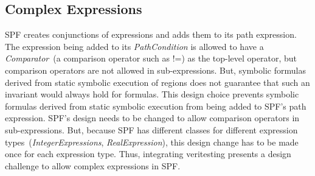 \subsection{Complex Expressions}
SPF creates conjunctions of expressions and adds them to its path expression.
%
The expression being added to its \textit{PathCondition} is allowed to have a \textit{Comparator}~(a comparison operator such as !=) as the top-level operator, but comparison operators are not allowed in sub-expressions.
%
But, symbolic formulas derived from static symbolic execution of regions does not guarantee that such an invariant would always hold for formulas.
%
This design choice prevents symbolic formulas derived from static symbolic execution from being added to SPF\rq s path expression.
%
SPF\rq s design needs to be changed to allow comparison operators in sub-expressions.
%
But, because SPF has different classes for different expression types~(\textit{IntegerExpressions}, \textit{RealExpression}), this design change has to be made once for each expression type.
%
Thus, integrating veritesting presents a design challenge to allow complex expressions in SPF.
%
